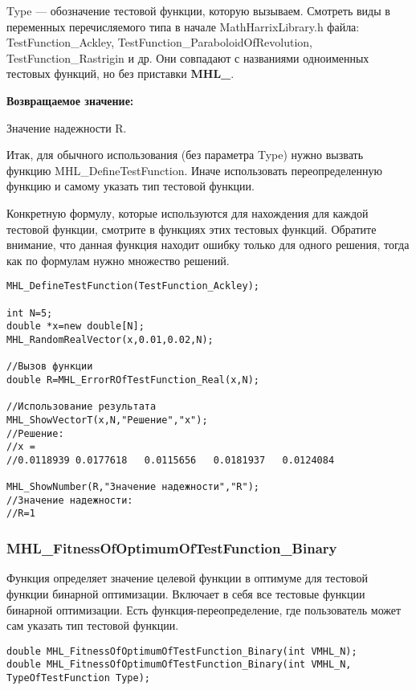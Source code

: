 \documentclass[a4paper,12pt]{article}
\begin{document}
Type --- обозначение тестовой функции, которую вызываем.
Смотреть виды в переменных перечисляемого типа в начале MathHarrixLibrary.h файла: TestFunction\_Ackley, TestFunction\_ParaboloidOfRevolution, TestFunction\_Rastrigin и др. Они совпадают с названиями одноименных тестовых функций, но без приставки \textbf{MHL\_}.

\textbf{Возвращаемое значение:}
 
Значение надежности R.

Итак, для обычного использования (без параметра Type) нужно вызвать функцию MHL\_DefineTestFunction. Иначе использовать переопределенную функцию и самому указать тип тестовой функции.

Конкретную формулу, которые используются для нахождения для каждой тестовой функции, смотрите в функциях этих тестовых функций. Обратите внимание, что данная функция находит ошибку только для одного решения, тогда как по формулам нужно множество решений.


\begin{lstlisting}[label=code_use_MHL_ErrorROfTestFunction_Real,caption=Пример использования]
MHL_DefineTestFunction(TestFunction_Ackley);

int N=5;
double *x=new double[N];
MHL_RandomRealVector(x,0.01,0.02,N);

//Вызов функции
double R=MHL_ErrorROfTestFunction_Real(x,N);

//Использование результата
MHL_ShowVectorT(x,N,"Решение","x");
//Решение:
//x =
//0.0118939	0.0177618	0.0115656	0.0181937	0.0124084

MHL_ShowNumber(R,"Значение надежности","R");
//Значение надежности:
//R=1
\end{lstlisting}

\subsubsection{MHL\_FitnessOfOptimumOfTestFunction\_Binary}\label{MHL_FitnessOfOptimumOfTestFunction_Binary}

Функция определяет значение целевой функции в оптимуме для тестовой функции бинарной оптимизации. Включает в себя все тестовые функции бинарной оптимизации. Есть функция-переопределение, где пользователь может сам указать тип тестовой функции.


\begin{lstlisting}[label=code_syntax_MHL_FitnessOfOptimumOfTestFunction_Binary,caption=Синтаксис]
double MHL_FitnessOfOptimumOfTestFunction_Binary(int VMHL_N);
double MHL_FitnessOfOptimumOfTestFunction_Binary(int VMHL_N, TypeOfTestFunction Type);
\end{lstlisting}
\end{document}
